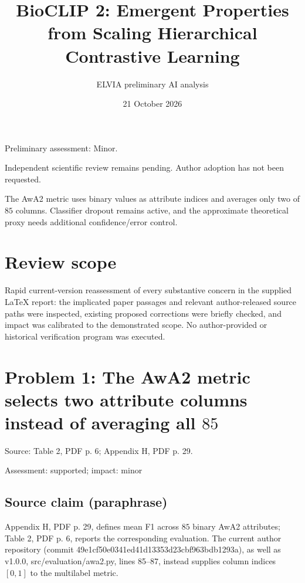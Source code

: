 \documentclass[11pt]{article}
\begin{document}
\title{BioCLIP 2: Emergent Properties from Scaling Hierarchical Contrastive Learning}

\author{ELVIA preliminary AI analysis}\date{21 October 2026}\maketitle

Preliminary assessment: Minor.\par

Independent scientific review remains pending. Author adoption has not been requested.

The AwA2 metric uses binary values as attribute indices and averages only two of \(85\) columns. Classifier dropout remains active, and the approximate theoretical proxy needs additional confidence/error control.

\section*{Review scope}

Rapid current-version reassessment of every substantive concern in the supplied LaTeX report: the implicated paper passages and relevant author-released source paths were inspected, existing proposed corrections were briefly checked, and impact was calibrated to the demonstrated scope. No author-provided or historical verification program was executed.

\section*{Problem 1: The AwA2 metric selects two attribute columns instead of averaging all \(85\)}

Source: Table 2, PDF p. 6; Appendix H, PDF p. 29.

Assessment: supported; impact: minor

\subsection*{Source claim (paraphrase)}

Appendix H, PDF p. 29, defines mean F1 across \(85\) binary AwA2 attributes; Table 2, PDF p. 6, reports the corresponding evaluation. The current author repository (commit 49e1cf50e0341ed41d13353d23cbf963bdb1293a), as well as v1.0.0, src/evaluation/awa2.py, lines 85–87, instead supplies column indices \([0,1]\) to the multilabel metric.
\end{document}
